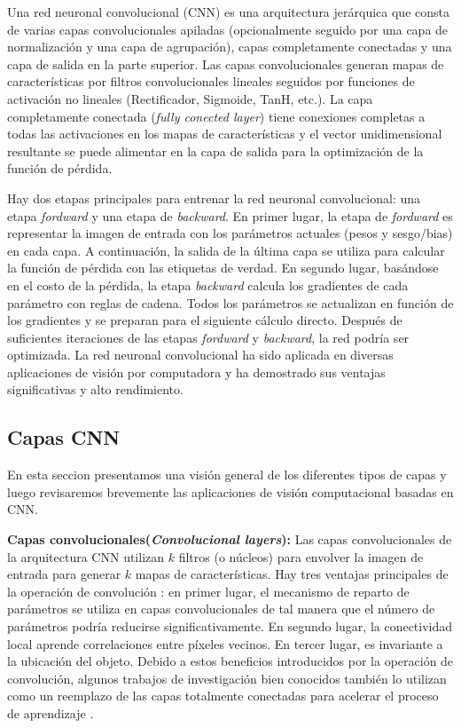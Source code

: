 Una red neuronal convolucional (CNN) es una arquitectura jerárquica \cite{LeCun} que consta de varias capas convolucionales apiladas (opcionalmente seguido por una capa de normalización y una capa de agrupación), capas completamente conectadas y una capa de salida en la parte superior. Las capas convolucionales generan mapas de características por filtros convolucionales lineales seguidos por funciones de activación no lineales (Rectificador, Sigmoide, TanH, etc.). La capa completamente conectada (\textit{fully conected layer}) tiene conexiones completas a todas las activaciones en los mapas de características y el vector unidimensional resultante se puede alimentar en la capa de salida para la optimización de la función de pérdida.

Hay dos etapas principales para entrenar la red neuronal convolucional: una etapa \textit{fordward}  y una etapa de \textit{backward}.  En primer lugar, la etapa de \textit{fordward} es representar la imagen de entrada con los parámetros actuales (pesos y sesgo/bias) en cada capa. A continuación, la salida de la última capa se utiliza para calcular la función de pérdida con las etiquetas de verdad. En segundo lugar, basándose en el costo de la pérdida, la etapa \textit{backward} calcula los gradientes de cada parámetro con reglas de cadena. Todos los parámetros se actualizan en función de los gradientes y se preparan para el siguiente cálculo directo. Después de suficientes iteraciones de las etapas \textit{fordward} y \textit{backward}, la red podría ser optimizada. La red neuronal convolucional ha sido aplicada en diversas aplicaciones de visión por computadora y ha demostrado sus ventajas significativas y alto rendimiento.

\subsection {Capas CNN}

En esta seccion presentamos una visión general de los diferentes tipos de capas y luego revisaremos brevemente las aplicaciones de visión computacional basadas en CNN.

\textbf{Capas convolucionales(\textit{Convolucional layers}):} Las capas convolucionales de la arquitectura CNN utilizan $k$ filtros (o núcleos) para envolver la imagen de entrada para generar $k$ mapas de características. Hay tres ventajas principales de la operación de convolución \cite{Zeiler}: en primer lugar, el mecanismo de reparto de parámetros se utiliza en capas convolucionales de tal manera que el número de parámetros podría reducirse significativamente. En segundo lugar, la conectividad local aprende correlaciones entre píxeles vecinos. En tercer lugar, es invariante a la ubicación del objeto. Debido a estos beneficios introducidos por la operación de convolución, algunos trabajos de investigación bien conocidos también lo utilizan como un reemplazo de las capas totalmente conectadas para acelerar el proceso de aprendizaje \cite{Szegedy,Oquab}.

